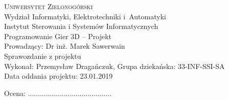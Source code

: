 \documentclass[10pt,a4paper]{article}
\begin{document}
\pagestyle{empty}

%
%

\begin{center}
\textsc{\Huge{Uniwersytet Zielonogórski}}\\
\LARGE{Wydział Informatyki, Elektrotechniki i~Automatyki}\\
\large{Instytut Sterowania i Systemów Informatycznych}\\
\vspace{0.5cm}
\Large{Programowanie Gier 3D -- Projekt}\\
Prowadzący: Dr inż. Marek Sawerwain \\ \vspace{1cm}
\LARGE{Sprawozdanie z projektu}\\

\vspace{0.5cm} 
\Large{Wykonał: Przemysław Dragańczuk, Grupa dziekańska: 33-INF-SSI-SA} \\

\Large{Data oddania projektu: 23.01.2019}
\vspace{1cm}

\begin{flushleft}
	Ocena: ..........................................
\end{flushleft}

\vspace{1cm}
\end{center}



%
%

\begin{multicols}{2}
	\footnotesize
	\tableofcontents
\end{multicols}

\noindent\makebox[\linewidth]{\rule{0.6\paperwidth}{0.4pt}}





\end{document}
